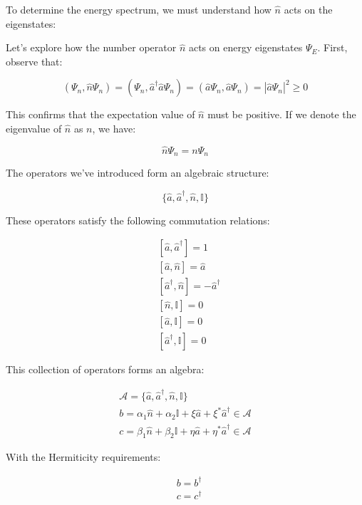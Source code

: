 \documentclass[italian]{HKNdocument}
\begin{document}
To determine the energy spectrum, we must understand how $\hat{n}$ acts on the eigenstates:


Let's explore how the number operator $\hat{n}$ acts on energy eigenstates $\Psi_E$. First, observe that:

\begin{equation*}
(\Psi_n, \hat{n}\Psi_n) = (\Psi_n, \hat{a}^\dagger\hat{a}\Psi_n) = (\hat{a}\Psi_n, \hat{a}\Psi_n) = |\hat{a}\Psi_n|^2 \geq 0 \tag{5.14}
\end{equation*}

This confirms that the expectation value of $\hat{n}$ must be positive. If we denote the eigenvalue of $\hat{n}$ as $n$, we have:

\begin{equation*}
\hat{n}\Psi_n = n\Psi_n \tag{5.15}
\end{equation*}

The operators we've introduced form an algebraic structure:

\begin{equation*}
\{\hat{a}, \hat{a}^\dagger, \hat{n}, \mathbb{I}\} \tag{5.16}
\end{equation*}

These operators satisfy the following commutation relations:

\begin{align*}
&[\hat{a}, \hat{a}^\dagger] = 1 \\
&[\hat{a}, \hat{n}] = \hat{a} \\
&[\hat{a}^\dagger, \hat{n}] = -\hat{a}^\dagger \tag{5.17} \\
&[\hat{n}, \mathbb{I}] = 0 \\
&[\hat{a}, \mathbb{I}] = 0 \\
&[\hat{a}^\dagger, \mathbb{I}] = 0
\end{align*}

This collection of operators forms an algebra:

\begin{gather*}
\mathcal{A} = \{\hat{a}, \hat{a}^\dagger, \hat{n}, \mathbb{I}\} \tag{5.18} \\
b = \alpha_1\hat{n} + \alpha_2\mathbb{I} + \xi\hat{a} + \xi^*\hat{a}^\dagger \in \mathcal{A} \\
c = \beta_1\hat{n} + \beta_2\mathbb{I} + \eta\hat{a} + \eta^*\hat{a}^\dagger \in \mathcal{A} \tag{5.19}
\end{gather*}

With the Hermiticity requirements:

\begin{align*}
&b = b^\dagger \\
&c = c^\dagger \tag{5.20}
\end{align*}
\end{document}
